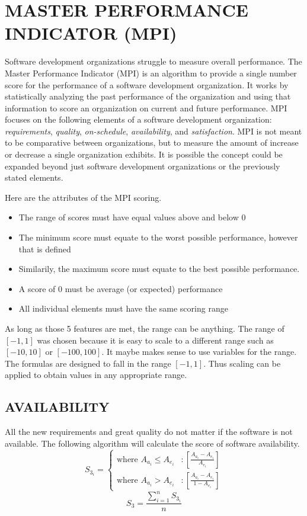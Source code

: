 \documentclass[SDSUThesis.tex]{subfiles}
\begin{document}
\section{MASTER PERFORMANCE INDICATOR (MPI)}

Software development organizations struggle to measure overall performance.  The Master Performance Indicator (MPI) is an algorithm to provide a single number score for the performance of a software development organization. It works by statistically analyzing the past performance of the organization and using that information to score an organization on current and future performance.  MPI focuses on the following elements of a software development organization: \textit{requirements},  \textit{quality},  \textit{on-schedule},  \textit{availability}, and  \textit{satisfaction}. MPI is not meant to be comparative between organizations, but to measure the amount of increase or decrease a single organization exhibits.
It is possible the concept could be expanded beyond just software development organizations or the previously stated elements. 

Here are the attributes of the MPI scoring.
            \begin{itemize}
                \item The range of scores must have equal values above and below 0
                \item The minimum score must equate to the worst possible performance, however that is defined
                \item Similarily, the maximum score must equate to the best possible performance.  
                \item A score of 0 must be average (or expected) performance
                \item All individual elements must have the same scoring range
            \end{itemize}
            
            As long as those 5 features are met, the range can be anything.  The range of $[-1,1]$ was chosen because it is easy to scale to a different range such as $[-10,10]$ or $[-100,100]$.  It maybe makes sense to use variables for the range.  The formulas are designed to fall in the range $[-1,1]$.  Thus scaling can be applied to obtain values in any appropriate range. 
            
\subsection{AVAILABILITY}
All the new requirements and great quality do not matter if the software is not available.  
The following algorithm will calculate the score of software availability.
\begin{displaymath}
   S_{3_i} = \left\{
     \begin{array}{lr}
       \text{where } A_{a_i} \leq A_{e_i} & : \left[ \frac{A_{a_i} - A_{e_i}}{A_{e_i}} \right] \\
       \text{where } A_{a_i} > A_{e_i}  & : \left[ \frac{A_{a_i} - A_{e_i} }{1-A_{e_i}} \right]
     \end{array}
   \right.
\end{displaymath} 
\[
    S_3 = \frac{\sum^n_{i=1}S_{3_i}}{n}
\]
\end{document}
